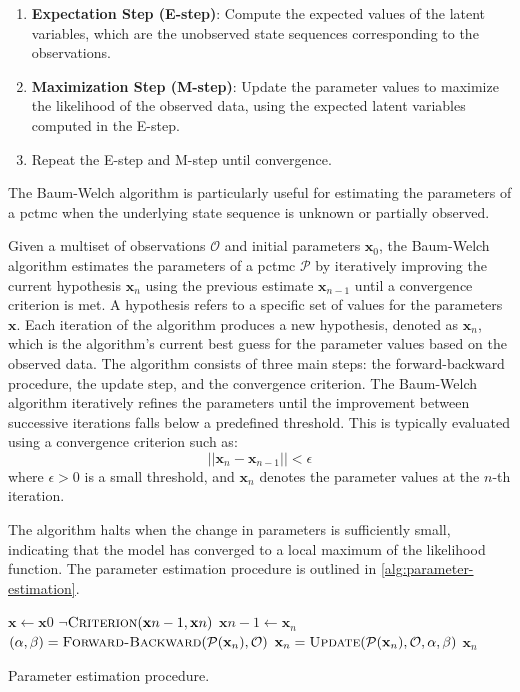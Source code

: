 \begin{enumerate}
    \item \textbf{Expectation Step (E-step)}: Compute the expected values of the latent variables, which are the unobserved state sequences corresponding to the observations.
    \item \textbf{Maximization Step (M-step)}: Update the parameter values to maximize the likelihood of the observed data, using the expected latent variables computed in the E-step.
    \item Repeat the E-step and M-step until convergence.
\end{enumerate}

The Baum-Welch algorithm is particularly useful for estimating the parameters of a \gls{pctmc} when the underlying state sequence is unknown or partially observed.

Given a multiset of observations $\mathcal{O}$ and initial parameters $\textbf{x}_0$, the Baum-Welch algorithm estimates the parameters of a \gls{pctmc} $\mathcal{P}$ by iteratively improving the current hypothesis $\textbf{x}_n$ using the previous estimate $\textbf{x}_{n-1}$ until a convergence criterion is met. 
A hypothesis refers to a specific set of values for the parameters $\mathbf{x}$. Each iteration of the algorithm produces a new hypothesis, denoted as $\textbf{x}_n$, which is the algorithm's current best guess for the parameter values based on the observed data.
The algorithm consists of three main steps: the forward-backward procedure, the update step, and the convergence criterion. 
The Baum-Welch algorithm iteratively refines the parameters until the improvement between successive iterations falls below a predefined threshold. This is typically evaluated using a convergence criterion such as:
\begin{equation}
    ||\textbf{x}_n - \textbf{x}_{n-1}|| < \epsilon
\end{equation} 
where $\epsilon > 0$ is a small threshold, and $\textbf{x}_n$ denotes the parameter values at the $n$-th iteration.

The algorithm halts when the change in parameters is sufficiently small, indicating that the model has converged to a local maximum of the likelihood function.
The parameter estimation procedure is outlined in \autoref{alg:parameter-estimation}.

\begin{algorithm}[htb!] 
    \begin{codebox} 
        \li $\mathbf{x} \gets \mathbf{x}0$ 
        \li \While $\neg\textnormal{\scshape Criterion}(\mathbf{x}{n-1}, \mathbf{x}n)$ 
        \li \Do $\mathbf{x}{n - 1} \gets \mathbf{x}_n$ 
        \li $(\alpha, \beta) = \proc{Forward-Backward}(\mathcal{P}(\mathbf{x}_n), \mathcal{O})$ 
        \li $\mathbf{x}_n = \proc{Update}(\mathcal{P}(\mathbf{x}_n), \mathcal{O}, \alpha, \beta)$ \End 
        \li \Return $\mathbf{x}_n$ 
    \end{codebox} 
    \caption{Parameter estimation procedure.} 
    \label{alg:parameter-estimation} 
\end{algorithm}

